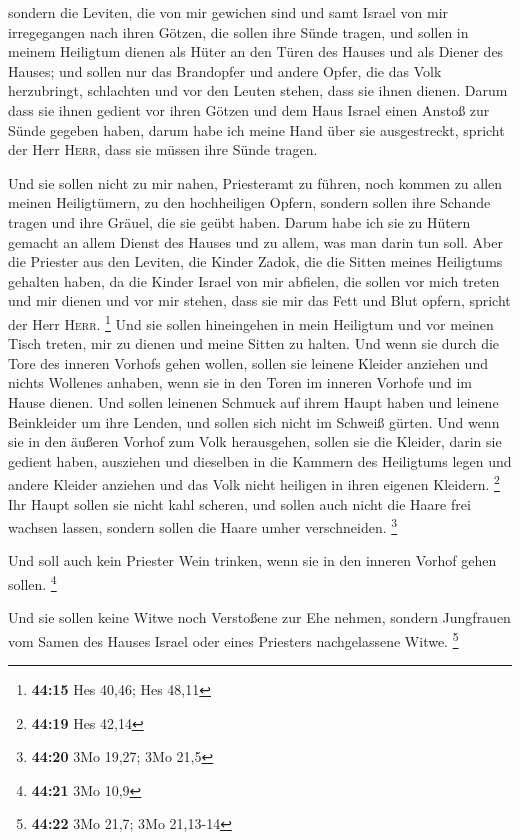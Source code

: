  sondern die Leviten, die von mir gewichen sind und samt
Israel von mir irregegangen nach ihren Götzen, die sollen ihre Sünde
tragen,  und sollen in meinem Heiligtum dienen als Hüter
an den Türen des Hauses und als Diener des Hauses; und sollen nur das
Brandopfer und andere Opfer, die das Volk herzubringt, schlachten und
vor den Leuten stehen, dass sie ihnen dienen.  Darum dass
sie ihnen gedient vor ihren Götzen und dem Haus Israel einen Anstoß zur
Sünde gegeben haben, darum habe ich meine Hand über sie ausgestreckt,
spricht der Herr \textsc{Herr}, dass sie müssen ihre Sünde tragen.

 Und sie sollen nicht zu mir nahen, Priesteramt zu
führen, noch kommen zu allen meinen Heiligtümern, zu den hochheiligen
Opfern, sondern sollen ihre Schande tragen und ihre Gräuel, die sie
geübt haben.  Darum habe ich sie zu Hütern gemacht an
allem Dienst des Hauses und zu allem, was man darin tun soll.
 Aber die Priester aus den Leviten, die Kinder Zadok, die
die Sitten meines Heiligtums gehalten haben, da die Kinder Israel von
mir abfielen, die sollen vor mich treten und mir dienen und vor mir
stehen, dass sie mir das Fett und Blut opfern, spricht der Herr
\textsc{Herr}. \footnote{\textbf{44:15} Hes 40,46; Hes 48,11}
 Und sie sollen hineingehen in mein Heiligtum und vor
meinen Tisch treten, mir zu dienen und meine Sitten zu halten.
 Und wenn sie durch die Tore des inneren Vorhofs gehen
wollen, sollen sie leinene Kleider anziehen und nichts Wollenes anhaben,
wenn sie in den Toren im inneren Vorhofe und im Hause dienen.
 Und sollen leinenen Schmuck auf ihrem Haupt haben und
leinene Beinkleider um ihre Lenden, und sollen sich nicht im Schweiß
gürten.  Und wenn sie in den äußeren Vorhof zum Volk
herausgehen, sollen sie die Kleider, darin sie gedient haben, ausziehen
und dieselben in die Kammern des Heiligtums legen und andere Kleider
anziehen und das Volk nicht heiligen in ihren eigenen Kleidern.
\footnote{\textbf{44:19} Hes 42,14}  Ihr Haupt sollen sie
nicht kahl scheren, und sollen auch nicht die Haare frei wachsen lassen,
sondern sollen die Haare umher verschneiden. \footnote{\textbf{44:20}
  3Mo 19,27; 3Mo 21,5}

 Und soll auch kein Priester Wein trinken, wenn sie in
den inneren Vorhof gehen sollen. \footnote{\textbf{44:21} 3Mo 10,9}

 Und sie sollen keine Witwe noch Verstoßene zur Ehe
nehmen, sondern Jungfrauen vom Samen des Hauses Israel oder eines
Priesters nachgelassene Witwe. \footnote{\textbf{44:22} 3Mo 21,7; 3Mo
  21,13-14}

